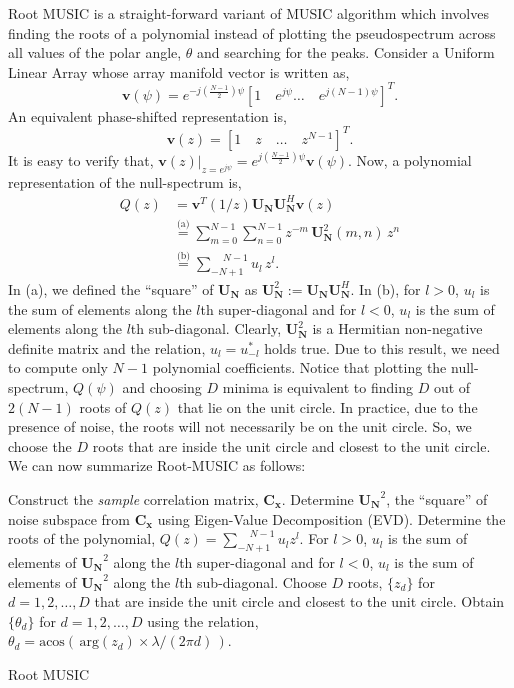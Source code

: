 \documentclass[a4paper, 11pt]{article}
\begin{document}
Root MUSIC is a straight-forward variant of MUSIC algorithm which involves finding the roots of a polynomial instead of plotting the pseudospectrum across all values of the polar angle, $\theta$ and searching for the peaks. Consider a Uniform Linear Array whose array manifold vector is written as,
\begin{equation}
\mathbf{v}(\psi)=e^{-j\left(\frac{N-1}{2}\right)\psi}\left[1\quad e^{j\psi}\hdots\quad e^{j(N-1)\psi}\right]^T.
\end{equation}
An equivalent phase-shifted representation is,
\begin{equation}
\mathbf{v}(z)=\left[1\quad z\quad\hdots\quad z^{N-1}\right]^T.
\end{equation}
It is easy to verify that, $\mathbf{v}(z)|_{z = e^{j\psi}}=e^{j\left(\frac{N-1}{2}\right)\psi}\mathbf{v}(\psi)$. Now, a polynomial representation of the null-spectrum is, 
\begin{align}
Q(z) &= \mathbf{v}^T(1/z)\mathbf{U_N}\mathbf{U}^H_\mathbf{N}\mathbf{v}(z) \nonumber \\
& \stackrel{\text{(a)}}{=} \sum_{m=0}^{N-1}\sum_{n=0}^{N-1}z^{-m}\,\mathbf{U}^2_\mathbf{N}(m, n)\,z^{n} \nonumber \\
& \stackrel{\text{(b)}}{=} \sum_{-N+1}^{\phantom{+}N-1}u_l\,z^l.
\label{rMUSIC_poly_eq}
\end{align}
In (a), we defined the ``square'' of $\mathbf{U_N}$ as $\mathbf{U}^2_\mathbf{N}:=\mathbf{U_N}\mathbf{U}^H_\mathbf{N}$. In (b), for $l>0$, $u_l$ is the sum of elements along the $l$th super-diagonal and for $l<0$,  $u_l$ is the sum of elements along the $l$th sub-diagonal. Clearly, $\mathbf{U}^2_\mathbf{N}$ is a Hermitian non-negative definite matrix and the relation, $u_l = u^*_{-l}$ holds true. Due to this result, we need to compute only $N-1$ polynomial coefficients. Notice that plotting the null-spectrum, $Q(\psi)$ and choosing $D$ minima is equivalent to finding $D$ out of $2(N-1)$ roots of $Q(z)$ that lie on the unit circle. In practice, due to the presence of noise, the roots will not necessarily be on the unit circle. So, we choose the $D$ roots that are inside the unit circle and closest to the unit circle. We can now summarize Root-MUSIC as follows:
\begin{algorithm}[H]
\renewcommand{\thealgorithm}{}
\begin{algorithmic}[1]
\State Construct the \textit{sample} correlation matrix, $\mathbf{C_x}$.
\State Determine $\mathbf{U_N}^2$, the ``square'' of noise subspace from $\mathbf{C_x}$ using Eigen-Value Decomposition (EVD).
\State Determine the roots of the polynomial, $Q(z)=\sum_{-N+1}^{\phantom{+}N-1}u_lz^l$. For $l>0$, $u_l$ is the sum of elements of $\mathbf{U_N}^2$ along the $l$th super-diagonal and for $l<0$,  $u_l$ is the sum of elements of $\mathbf{U_N}^2$ along the $l$th sub-diagonal. 
\State Choose $D$ roots, $\{z_d\}$ for $d=1,2,\hdots,D$ that are inside the unit circle and closest to the unit circle.
\State Obtain $\{\theta_d\}$ for $d=1,2,\hdots,D$ using the relation,
\Statex $\phantom{indentation}$ $\theta_d=\mathrm{acos}\left(\,\mathrm{arg}(z_d)\times\lambda/(2\pi d)\,\right)$.
\end{algorithmic}
\caption{Root MUSIC}
\end{algorithm}
\end{document}
